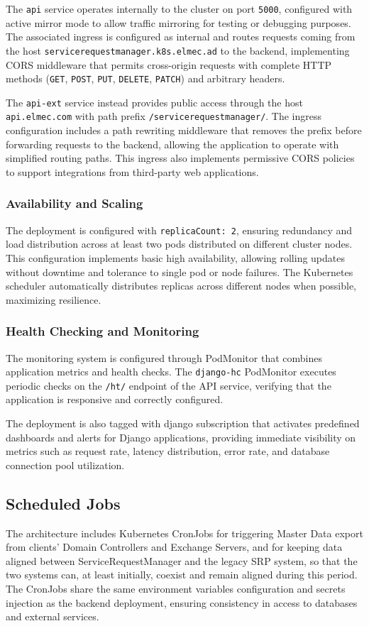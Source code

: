 The \texttt{api} service operates internally to the cluster on port \texttt{5000}, configured with active mirror mode to allow traffic mirroring for testing or debugging purposes. The associated ingress is configured as internal and routes requests coming from the host \texttt{servicerequestmanager.k8s.elmec.ad} to the backend, implementing CORS middleware that permits cross-origin requests with complete HTTP methods (\texttt{GET}, \texttt{POST}, \texttt{PUT}, \texttt{DELETE}, \texttt{PATCH}) and arbitrary headers.

The \texttt{api-ext} service instead provides public access through the host \texttt{api.elmec.com} with path prefix \texttt{/servicerequestmanager/}. The ingress configuration includes a path rewriting middleware that removes the prefix before forwarding requests to the backend, allowing the application to operate with simplified routing paths. This ingress also implements permissive CORS policies to support integrations from third-party web applications.

\subsubsection{Availability and Scaling}
The deployment is configured with \texttt{replicaCount: 2}, ensuring redundancy and load distribution across at least two pods distributed on different cluster nodes. This configuration implements basic high availability, allowing rolling updates without downtime and tolerance to single pod or node failures. The Kubernetes scheduler automatically distributes replicas across different nodes when possible, maximizing resilience.

\subsubsection{Health Checking and Monitoring}
The monitoring system is configured through PodMonitor that combines application metrics and health checks. The \texttt{django-hc} PodMonitor executes periodic checks on the \texttt{/ht/} endpoint of the API service, verifying that the application is responsive and correctly configured.

The deployment is also tagged with django subscription that activates predefined dashboards and alerts for Django applications, providing immediate visibility on metrics such as request rate, latency distribution, error rate, and database connection pool utilization.

\subsection{Scheduled Jobs}
The architecture includes Kubernetes CronJobs for triggering Master Data export from clients' Domain Controllers and Exchange Servers, and for keeping data aligned between ServiceRequestManager and the legacy SRP system, so that the two systems can, at least initially, coexist and remain aligned during this period.
The CronJobs share the same environment variables configuration and secrets injection as the backend deployment, ensuring consistency in access to databases and external services.

